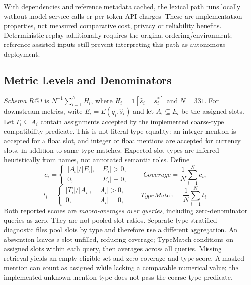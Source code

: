 \documentclass[pdflatex,sn-basic,Numbered]{sn-jnl}
\begin{document}
With dependencies and reference metadata cached, the lexical path runs locally without model-service calls or per-token API charges. These are implementation properties, not measured comparative cost, privacy or reliability benefits. Deterministic replay additionally requires the original ordering/environment; reference-assisted inputs still prevent interpreting this path as autonomous deployment.

\subsection{Metric Levels and Denominators}
\textit{Schema R@1} is $N^{-1}\sum_{i=1}^N H_i$, where $H_i=\mathbb{1}[\hat{s}_i=s_i^*]$ and $N=331$. For downstream metrics, write $E_i=E(q_i,\hat{s}_i)$ and let $A_i\subseteq E_i$ be the assigned slots. Let $T_i\subseteq A_i$ contain assignments accepted by the implemented coarse-type compatibility predicate. This is not literal type equality: an integer mention is accepted for a float slot, and integer or float mentions are accepted for currency slots, in addition to same-type matches. Expected slot types are inferred heuristically from names, not annotated semantic roles. Define
\begin{equation}
c_i=\begin{cases}|A_i|/|E_i|,& |E_i|>0,\\0,& |E_i|=0,\end{cases}
\qquad
\textit{Coverage}=\frac{1}{N}\sum_{i=1}^N c_i,
\label{eq:coverage}
\end{equation}
\begin{equation}
t_i=\begin{cases}|T_i|/|A_i|,& |A_i|>0,\\0,& |A_i|=0,\end{cases}
\qquad
\textit{TypeMatch}=\frac{1}{N}\sum_{i=1}^N t_i.
\label{eq:typematch}
\end{equation}
Both reported scores are \emph{macro-averages over queries}, including zero-denominator queries as zero. They are not pooled slot ratios. Separate type-stratified diagnostic files pool slots by type and therefore use a different aggregation. An abstention leaves a slot unfilled, reducing coverage; TypeMatch conditions on assigned slots within each query, then averages across all queries. Missing retrieval yields an empty eligible set and zero coverage and type score. A masked mention can count as assigned while lacking a comparable numerical value; the implemented unknown mention type does not pass the coarse-type predicate.
\end{document}

